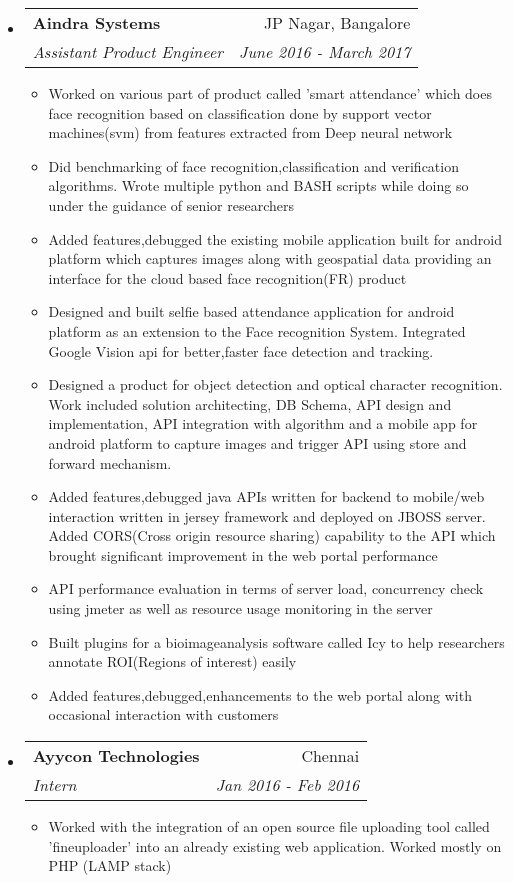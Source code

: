 \documentclass[letterpaper,11pt]{article}
\makeatletter
\newcommand{\resitem}[1]{\item #1 \vspace{-2pt}}
\newcommand{\ressubheading}[4]{
\begin{tabular*}{6.5in}{l@{\extracolsep{\fill}}r}
		\textbf{#1} & #2 \\
		\textit{#3} & \textit{#4} \\
\end{tabular*}\vspace{-6pt}}
\makeatother
\begin{document}
\begin{itemize}
\item
	\ressubheading{Aindra Systems}{JP Nagar, Bangalore}{Assistant Product Engineer}{June 2016 - March 2017}
	\begin{itemize}
		\resitem{Worked on various part of product called 'smart attendance' which does face recognition based on classification done by support vector machines(svm) from features extracted from Deep neural network}
		\resitem{Did benchmarking of face recognition,classification and verification algorithms. Wrote multiple python and BASH scripts while doing so under the guidance of senior researchers}
		\resitem{Added features,debugged the existing mobile application built for android platform which captures images along with geospatial data providing an interface for the cloud based face recognition(FR) product}
		\resitem{Designed and built selfie based attendance application for android platform as an extension to the Face recognition System. Integrated Google Vision api for better,faster face detection and tracking.}
		\resitem{Designed a product for object detection and optical character recognition. Work included solution architecting, DB Schema, API design and implementation, API integration with algorithm and a mobile app for android platform to capture images and trigger API using store and forward mechanism.}
		\resitem{Added features,debugged java APIs written for backend to mobile/web interaction written in jersey framework and deployed on JBOSS server. Added CORS(Cross origin resource sharing) capability to the API which brought significant improvement in the web portal performance}
		\resitem{API performance evaluation in terms of server load, concurrency check using jmeter as well as resource usage monitoring in the server}
		\resitem{Built plugins for a bioimageanalysis software called Icy to help researchers annotate ROI(Regions of interest) easily}
		\resitem{Added features,debugged,enhancements to the web  portal along with occasional interaction with customers}
	\end{itemize}
\end{itemize}

\begin{itemize}
	\item
\ressubheading{Ayycon Technologies}{Chennai}{Intern}{Jan 2016 - Feb 2016}
	\begin{itemize}
		\resitem{Worked with the integration of an open source file uploading tool called 'fineuploader' into an already existing web application. Worked mostly on PHP (LAMP stack)}
	\end{itemize}
\end{itemize}
 
\end{document}
